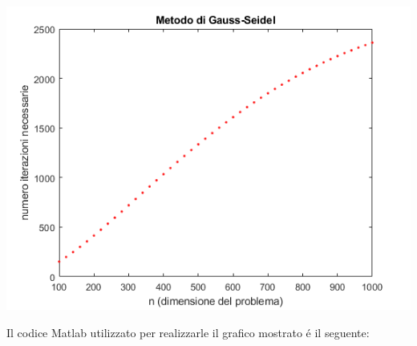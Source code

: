 \begin{center}
\footnotesize\noindent{}\end{center}


\begin{center}
	\includegraphics[scale=0.9]{cap6/6_4.png}
\end{center}

\noindent Il codice Matlab utilizzato per realizzarle il grafico mostrato \'e il seguente: \\


